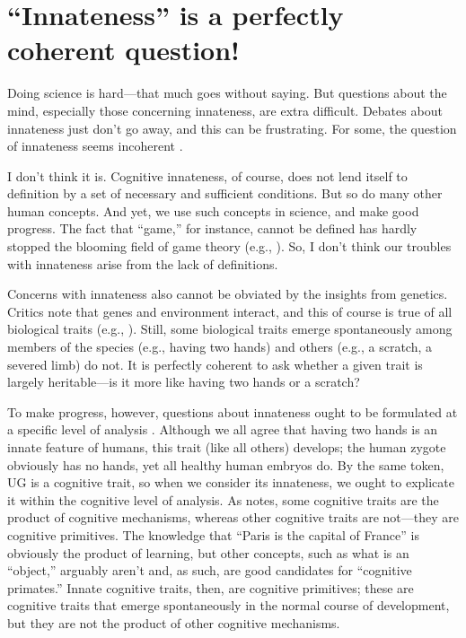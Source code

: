 \documentclass[output=paper,colorlinks,citecolor=brown
]{langscibook}
\begin{document}
\section{“Innateness” is a perfectly coherent question!}
Doing science is hard—that much goes without saying. But questions about the mind, especially those concerning innateness, are extra difficult. Debates about innateness just don’t go away, and this can be frustrating. For some, the question of innateness seems incoherent \citep{mameli2011evaluation}. 

I don’t think it is. Cognitive innateness, of course, does not lend itself to definition by a set of necessary and sufficient conditions. But so do many other human concepts. And yet, we use such concepts in science, and make good progress. The fact that “game,” for instance, cannot be defined \citep{wittgenstein1953philosophical} has hardly stopped the blooming field of game theory (e.g., \cite{nowak1999evolution}).  So, I don’t think our troubles with innateness arise from the lack of definitions.

Concerns with innateness also cannot be obviated by the insights from genetics. Critics note that genes and environment interact, and this of course is true of all biological traits (e.g., \cite{ridley2003nature}). Still, some biological traits emerge spontaneously among members of the species (e.g., having two hands) and others (e.g., a scratch, a severed limb) do not. It is perfectly coherent to ask whether a given trait is largely heritable—is it more like having two hands or a scratch?

To make progress, however, questions about innateness ought to be formulated at a specific level of analysis \citep{samuels2004innateness}. Although we all agree that having two hands is an innate feature of humans, this trait (like all others) develops; the human zygote obviously has no hands, yet all healthy human embryos do. 
By the same token, UG is a cognitive trait, so when we consider its innateness, we ought to explicate it within the cognitive level of analysis. As \citet{samuels2004innateness} notes, some cognitive traits are the product of cognitive mechanisms, whereas other cognitive traits are not—they are cognitive primitives. The knowledge that “Paris is the capital of France” is obviously the product of learning, but other concepts, such as what is an “object,” arguably aren’t and, as such, are good candidates for “cognitive primates.” Innate cognitive traits, then, are cognitive primitives; these are cognitive traits that emerge spontaneously in the normal course of development, but they are not the product of other cognitive mechanisms.
\end{document}
